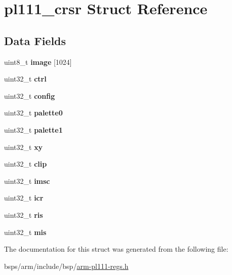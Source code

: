 \hypertarget{structpl111__crsr}{}\section{pl111\+\_\+crsr Struct Reference}
\label{structpl111__crsr}
\subsection*{Data Fields}
\begin{DoxyCompactItemize}
\item 
\mbox{\label{structpl111__crsr_a58c9de74627ac7d94cc15d6a257ac8e9}} 
uint8\+\_\+t {\bfseries image} \mbox{[}1024\mbox{]}
\item 
\mbox{\label{structpl111__crsr_ac9ceacd336201ddc4a9c796ba359e983}} 
uint32\+\_\+t {\bfseries ctrl}
\item 
\mbox{\label{structpl111__crsr_ab3409734f24871e6d6cb28713c117906}} 
uint32\+\_\+t {\bfseries config}
\item 
\mbox{\label{structpl111__crsr_ab92446c59d1fd9f9b2fcd0231c20edb8}} 
uint32\+\_\+t {\bfseries palette0}
\item 
\mbox{\label{structpl111__crsr_aec5b2fbb09ecb7be597c1839132b5ca8}} 
uint32\+\_\+t {\bfseries palette1}
\item 
\mbox{\label{structpl111__crsr_a2fe124538db02e35862a1d972e82bbf7}} 
uint32\+\_\+t {\bfseries xy}
\item 
\mbox{\label{structpl111__crsr_ad008aea901634f5ee868837afcae715c}} 
uint32\+\_\+t {\bfseries clip}
\item 
\mbox{\label{structpl111__crsr_a39e16e8213539617038e3046c9b6b78d}} 
uint32\+\_\+t {\bfseries imsc}
\item 
\mbox{\label{structpl111__crsr_aa6b0ebd47a50f5fe44e20c6b280ea55d}} 
uint32\+\_\+t {\bfseries icr}
\item 
\mbox{\label{structpl111__crsr_afbae2d69624c752c75e194fea93192fd}} 
uint32\+\_\+t {\bfseries ris}
\item 
\mbox{\label{structpl111__crsr_ad4c4f3ea9e55ce79cc25da289628311c}} 
uint32\+\_\+t {\bfseries mis}
\end{DoxyCompactItemize}


The documentation for this struct was generated from the following file\+:\begin{DoxyCompactItemize}
\item 
bsps/arm/include/bsp/\mbox{\hyperlink{arm-pl111-regs_8h}{arm-\/pl111-\/regs.\+h}}\end{DoxyCompactItemize}
